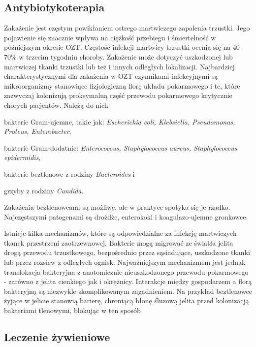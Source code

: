 \documentclass[a4paper, 12pt]{report}
\begin{document}
\subsection{Antybiotykoterapia}

Zakażenie jest częstym powikłaniem ostrego martwiczego zapalenia
trzustki. Jego pojawienie się znacznie wpływa na ciężkość przebiegu i
śmiertelność w późniejszym okresie OZT. Częstość infekcji martwicy
trzustki ocenia się na 40-70\% w trzecim tygodniu choroby. Zakażenie
może dotyczyć uszkodzonej lub martwiczej tkanki trzustki lub też i
innych odległych lokalizacji. Najbardziej charakterystycznymi dla
zakażenia w OZT czynnikami infekcyjnymi są mikroorganizmy stanowiące
fizjologiczną florę układu pokarmowego i te, które zazwyczaj
kolonizują proksymalną część przewodu pokarmowego krytycznie chorych
pacjentów. Należą do nich:
\begin{inparaenum}
\item bakterie Gram-ujemne, takie jak: \textsl{Escherichia coli,
    Klebsiella, Pseudomonas, Proteus, Enterobacter},
\item bakterie Gram-dodatnie: \textsl{Enterococcus, Staphylococcus aureus,
    Staphylococcus epidermidis},
\item bakterie beztlenowe z rodziny \textsl{Bacteroides} i
\item grzyby z rodziny \textsl{Candida.}
\end{inparaenum}
Zakażenia beztlenowcami są możliwe, ale w praktyce spotyka się je
rzadko. Najczęstszymi patogenami są drożdże, enterokoki i
koagulazo-ujemne gronkowce. 

Istnieje kilka mechanizmów, które są odpowiedzialne za infekcję martwiczych
tkanek przestrzeni zaotrzewnowej. Bakterie mogą migrować ze światła jelita drogą 
przewodu trzustkowego, bezpośrednio przez sąsiadujące, uszkodzone
tkanki lub przez rozsiew z odległych ognisk. Najważniejszym mechanizmem
jest jednak translokacja bakteryjna z anatomicznie nieuszkodzonego
przewodu pokarmowego - zarówno z jelita cienkiego jak i
okrężnicy. Interakcje między gospodarzem a florą bakteryjną są
niezwykle skomplikowanym zagadnieniem. Na przykład beztlenowce żyjące
w jelicie stanowią barierę, chroniącą błonę śluzową jelita przed
kolonizacją bakteriami tlenowymi, blokując w ten sposób

\subsection{Leczenie żywieniowe}
\end{document}
